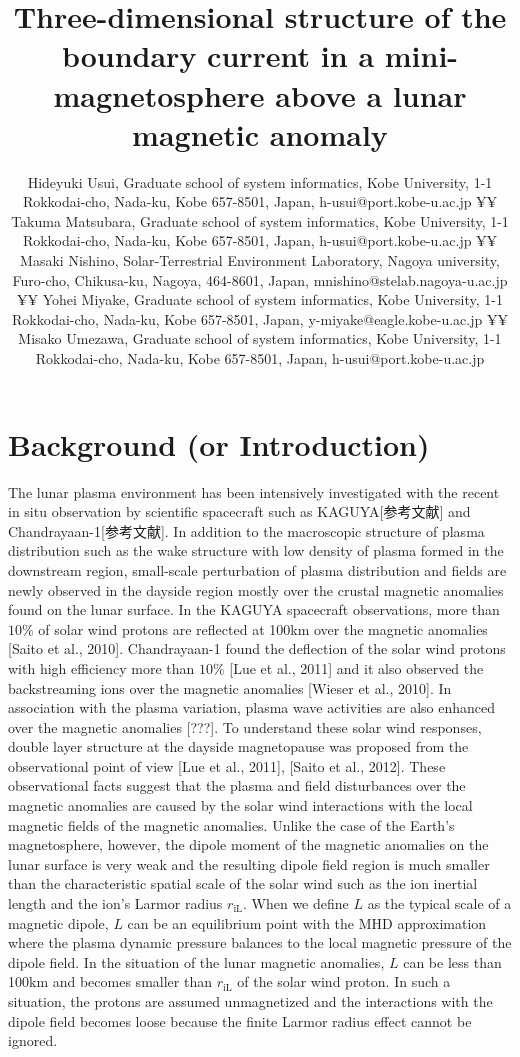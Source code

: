 \documentclass{EPS}
\title{Three-dimensional structure of the boundary current in a mini-magnetosphere above a lunar magnetic anomaly 
}
\author{
	Hideyuki Usui, 
	Graduate school of system informatics, Kobe University, 
	1-1 Rokkodai-cho, Nada-ku, Kobe 657-8501, Japan, h-usui@port.kobe-u.ac.jp ¥¥
	Takuma Matsubara, 
	Graduate school of system informatics, Kobe University, 
	1-1 Rokkodai-cho, Nada-ku, Kobe 657-8501, Japan, h-usui@port.kobe-u.ac.jp ¥¥
	Masaki Nishino, 
	Solar-Terrestrial Environment Laboratory, Nagoya university, 
	Furo-cho, Chikusa-ku, Nagoya, 464-8601, Japan, mnishino@stelab.nagoya-u.ac.jp  ¥¥
	Yohei Miyake, 
	Graduate school of system informatics, Kobe University, 
	1-1 Rokkodai-cho, Nada-ku, Kobe 657-8501, Japan, y-miyake@eagle.kobe-u.ac.jp ¥¥
	Misako Umezawa, 
	Graduate school of system informatics, Kobe University, 
	1-1 Rokkodai-cho, Nada-ku, Kobe 657-8501, Japan, h-usui@port.kobe-u.ac.jp
}
\begin{document}
\maketitle

\section{Background (or Introduction)}
The lunar plasma environment has been intensively investigated with the recent in situ observation 
by scientific spacecraft such as KAGUYA[参考文献] and Chandrayaan-1[参考文献]. 
In addition to the macroscopic structure of plasma distribution such as the wake structure 
with low density of plasma formed in the downstream region, small-scale perturbation of 
plasma distribution and fields are newly observed in the dayside region mostly 
over the crustal magnetic anomalies found on the lunar surface. 
In the KAGUYA spacecraft observations, more than $10 \%$ of solar wind protons are reflected 
at 100km over the magnetic anomalies [Saito et al., 2010]. 
Chandrayaan-1 found the deflection of the solar wind protons with high efficiency more than $ 10 \%$ [Lue et al., 2011]  
and it also observed the backstreaming ions over the magnetic anomalies [Wieser et al., 2010]. 
In association with the plasma variation, plasma wave activities are also enhanced over 
the magnetic anomalies [???].
To understand these solar wind responses, double layer structure at the dayside magnetopause was 
proposed from the observational point of view [Lue et al., 2011], [Saito et al., 2012]. 
These observational facts suggest that the plasma and field disturbances over 
the magnetic anomalies are caused by the solar wind interactions with the local magnetic fields of the magnetic anomalies. 
Unlike the case of the Earth’s magnetosphere, however, the dipole moment of 
the magnetic anomalies on the lunar surface is very weak and the resulting dipole field region 
is much smaller than the characteristic spatial scale of the solar wind such as 
the ion inertial length and the ion's Larmor radius $r_\mathrm{iL}$. 
When we define $L$ as the typical scale of a magnetic dipole, 
$L$ can be an equilibrium point with the MHD approximation where the plasma dynamic pressure balances 
to the local magnetic pressure of the dipole field. 
In the situation of the lunar magnetic anomalies, $L$ can be less than 100km and 
becomes smaller than $r_\mathrm{iL}$ of the solar wind proton. 
In such a situation, the protons are assumed unmagnetized and the interactions with the dipole field becomes 
loose because the finite Larmor radius effect cannot be ignored. 
\end{document}
